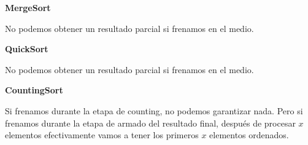 \textbf{MergeSort}

No podemos obtener un resultado parcial si frenamos en el medio.

\textbf{QuickSort}

No podemos obtener un resultado parcial si frenamos en el medio.

\textbf{CountingSort}

Si frenamos durante la etapa de counting, no podemos garantizar nada. Pero si frenamos durante la etapa de armado del resultado final, después de procesar $x$ elementos efectivamente vamos a tener los primeros $x$ elementos ordenados.

